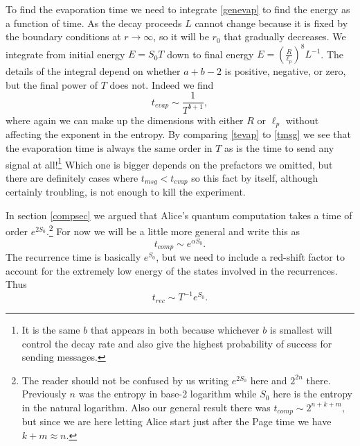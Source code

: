 \documentclass[12pt]{article}
\newcommand{\be}{\begin{equation}}
\newcommand{\ee}{\end{equation}}
\begin{document}
To find the evaporation time we need to integrate \eqref{genevap} to find the energy as a function of time.  As the decay proceeds $L$ cannot change because it is fixed by the boundary conditions at $r\to \infty$, so it will be $r_0$ that gradually decreases.  We integrate from initial energy $E=S_0 T$ down to final energy $E=\left(\frac{R}{\ell_p}\right)^8 L^{-1}$.  The details of the integral depend on whether  $a+b-2$ is positive, negative, or zero, but the final power of $T$ does not.  Indeed we find
\be\label{tevap}
t_{evap}\sim \frac{1}{T^{b+1}},
\ee 
where again we can make up the dimensions with either $R$ or $\ell_p$ without affecting the exponent in the entropy.  By comparing \eqref{tevap} to \eqref{tmsg} we see that the evaporation time is always the same order in $T$ as is the time to send any signal at all!\footnote{It is the same $b$ that appears in both because whichever $b$ is smallest will control the decay rate and also give the highest probability of success for sending messages.}  Which one is bigger depends on the prefactors we omitted, but there are definitely cases where $t_{msg}<t_{evap}$ so this fact by itself, although certainly troubling, is not enough to kill the experiment.  

In section \ref{compsec} we argued that Alice's quantum computation takes a time of order $e^{2S_0}$.\footnote{The reader should not be confused by us writing $e^{2S_0}$ here and $2^{2n}$ there. Previously $n$ was the entropy in base-2 logarithm while $S_0$ here is the entropy in the natural logarithm.  Also our general result there was $t_{comp}\sim2^{n+k+m}$, but since we are here letting Alice start just after the Page time we have $k+m\approx n$.}  For now we will be a little more general and write this as
\be
t_{comp}\sim e^{\alpha S_0}.
\ee
The recurrence time is basically $e^{S_0}$, but we need to include a red-shift factor to account for the extremely low energy of the states involved in the recurrences.  Thus
\be
t_{rec}\sim T^{-1} e^{S_0}.
\ee
\end{document}
